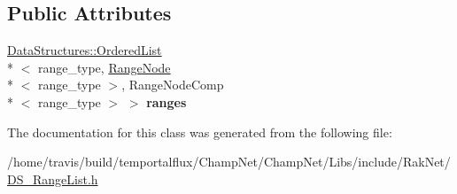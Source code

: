\subsection*{Public Attributes}
\begin{DoxyCompactItemize}
\item 
\hypertarget{class_data_structures_1_1_range_list_a01e3478712140cf3d891da0f865bddd1}{\hyperlink{class_data_structures_1_1_ordered_list}{Data\-Structures\-::\-Ordered\-List}\\*
$<$ range\-\_\-type, \hyperlink{struct_data_structures_1_1_range_node}{Range\-Node}\\*
$<$ range\-\_\-type $>$, Range\-Node\-Comp\\*
$<$ range\-\_\-type $>$ $>$ {\bfseries ranges}}\label{class_data_structures_1_1_range_list_a01e3478712140cf3d891da0f865bddd1}

\end{DoxyCompactItemize}


The documentation for this class was generated from the following file\-:\begin{DoxyCompactItemize}
\item 
/home/travis/build/temportalflux/\-Champ\-Net/\-Champ\-Net/\-Libs/include/\-Rak\-Net/\hyperlink{_d_s___range_list_8h}{D\-S\-\_\-\-Range\-List.\-h}\end{DoxyCompactItemize}
